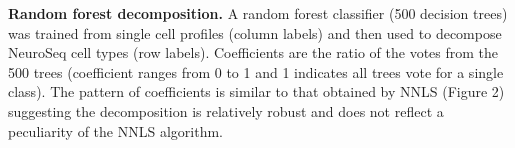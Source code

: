 \textbf{Random forest decomposition. }
A random forest classifier (500 decision trees) was trained from single cell profiles (column labels) and then used to decompose NeuroSeq cell types (row labels). Coefficients are the ratio of the votes from the 500 trees (coefficient ranges from 0 to 1 and 1 indicates all trees vote for a single class). The pattern of coefficients is similar to that obtained by NNLS (Figure 2) suggesting the decomposition is relatively robust and does not reflect a peculiarity of the NNLS algorithm.
